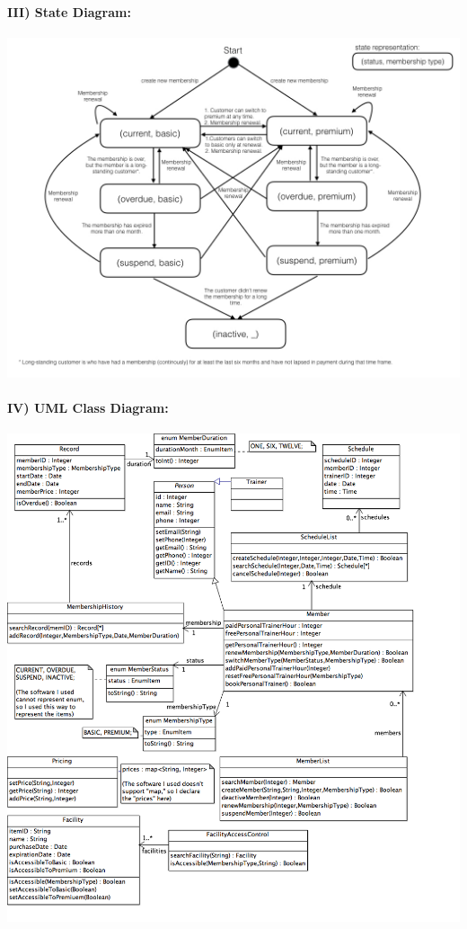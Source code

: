 \documentclass[11pt]{article}
\begin{document}
\paragraph{III) State Diagram:\\}
\begin{center}
\includegraphics[scale=0.5]{StateDiagram.jpeg} 
\end{center}

\newpage
\paragraph{IV) UML Class Diagram:\\}
\begin{center}
\includegraphics[scale=0.5]{ClassDiagram} 
\end{center}
\end{document}
